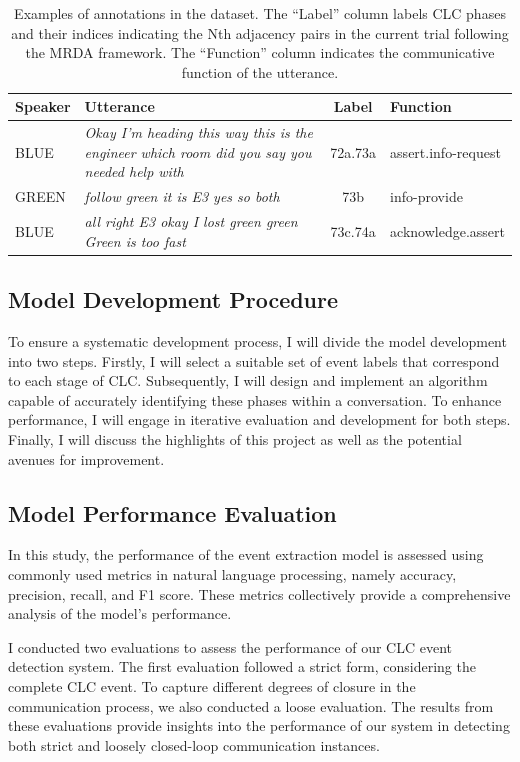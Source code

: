 \documentclass[11pt]{article}
\begin{document}
\begin{table}
    \centering
    \footnotesize
    \begin{tabularx}{\linewidth}{p{0.8cm}XcX}
    \toprule
     Speaker & Utterance &  Label & Function\\
     \midrule
     BLUE & \emph{Okay I'm heading this way this is the engineer which room did you say you needed help with}    & 72a.73a & assert.info-request\\
     GREEN & \emph{follow green it is E3 yes so both} & 73b & info-provide\\
     BLUE & \emph{all right E3 okay I lost green green Green is too fast} & 73c.74a & acknowledge.assert\\
     \bottomrule
    \end{tabularx}
    \caption{Examples of annotations in the dataset. The ``Label'' column labels CLC phases and their indices indicating the Nth adjacency pairs in the current trial following the MRDA framework. The ``Function'' column indicates the communicative function of the utterance.}
    \label{tab:clc-annotation-example}
\end{table}

\subsection{Model Development Procedure}
To ensure a systematic development process, I will divide the model development into two steps. Firstly, I will select a suitable set of event labels that correspond to each stage of CLC. Subsequently, I will design and implement an algorithm capable of accurately identifying these phases within a conversation. To enhance performance, I will engage in iterative evaluation and development for both steps. Finally, I will discuss the highlights of this project as well as the potential avenues for improvement.

\subsection{Model Performance Evaluation}
In this study, the performance of the event extraction model is assessed using commonly used metrics in natural language processing, namely accuracy, precision, recall, and F1 score. These metrics collectively provide a comprehensive analysis of the model's performance.

I conducted two evaluations to assess the performance of our CLC event detection system. The first evaluation followed a strict form, considering the complete CLC event. To capture different degrees of closure in the communication process, we also conducted a loose evaluation. The results from these evaluations provide insights into the performance of our system in detecting both strict and loosely closed-loop communication instances.
\end{document}
